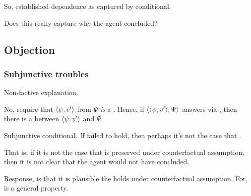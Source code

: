 \begin{note}
  So, established dependence as captured by conditional.

  Does this really capture why the agent concluded?
\end{note}


\subsection{Objection}
\label{sec:objection}

\subsubsection{Subjunctive troubles}
\label{sec:subjunctive-troubles}

\begin{note}
  Non-factive explanation.

  No,  require that \(\langle \psi, v' \rangle\) from \(\Psi\) \emph{is} a \fc{}.
  Hence, if \(\langle \langle \psi, v' \rangle, \Psi \rangle\) answers \qWhyV{} via \requ{}, then there is a \ros{} between \(\langle \psi, v' \rangle\) and \(\Psi\).
\end{note}

\begin{note}
  Subjunctive conditional.
  If \ros{} failed to hold, then perhaps it's not the case that \requ{}.

  That is, if it is not the case that \requ{} is preserved under counterfactual assumption, then it is not clear that the agent would not have concluded.
\end{note}

\begin{note}
  Response, is that it is plausible the \requ{} holds under counterfactual assumption.
  For, \requ{} is a general property.
\end{note}

